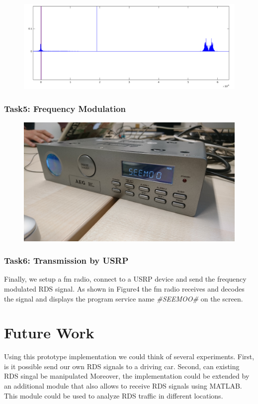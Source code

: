 \documentclass[sigconf]{acmart}
\begin{document}
\begin{figure}[tb!]
	\includegraphics[width=1\linewidth]{baseband_spectrum2.png}
	\caption{}
	\label{fig:rds_filt_plot}
\end{figure}

\hypertarget{Task5:ux20Frequencyux20Modulation}{%
\subsubsection{Task5: Frequency
Modulation}\label{Task5:ux20Frequencyux20Modulation}}

\begin{figure}[tb!]
	\includegraphics[width=1\linewidth]{radio_display.png}
	\caption{}
	\label{fig:rds_filt_plot}
\end{figure}


\hypertarget{Task6:ux20Transmission by USRPux20}{%
\subsubsection{Task6: Transmission by USRP}
\label{Task6:ux20Transmission by USRPux20}}
Finally, we setup a fm radio, connect to a USRP device and send the frequency modulated RDS signal.
As shown in Figure4 the fm radio receives and decodes the signal and displays the program service
name \textit{#SEEMOO#} on the screen.

\section{Future Work}
Using this prototype implementation we could think of several experiments. First, is it possible
send our own RDS signals to a driving car. Second, can existing RDS singal be manipulated  
Moreover, the implementation could be extended by an additional module that also allows to receive
RDS signals using MATLAB. This module could be used to analyze RDS traffic in different locations.




 
\end{document}
